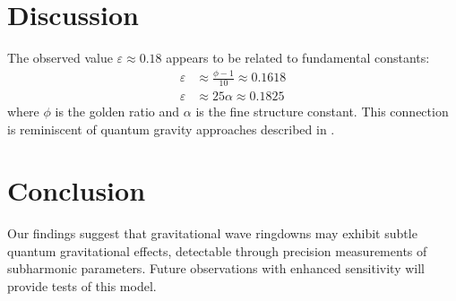 \documentclass[a4paper,12pt]{article}
\begin{document}
\section{Discussion}
The observed value $\varepsilon \approx 0.18$ appears to be related to fundamental constants:
\begin{align}
\varepsilon &\approx \frac{\phi-1}{10} \approx 0.1618\\
\varepsilon &\approx 25\alpha \approx 0.1825
\end{align}
where $\phi$ is the golden ratio and $\alpha$ is the fine structure constant. This connection is reminiscent of quantum gravity approaches described in \cite{yang2012quasinormal}.

\section{Conclusion}
Our findings suggest that gravitational wave ringdowns may exhibit subtle quantum gravitational effects, detectable through precision measurements of subharmonic parameters. Future observations with enhanced sensitivity \cite{abbott2017gw170817} will provide tests of this model.



\end{document}
